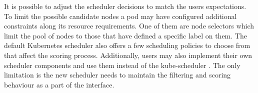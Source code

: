 It is possible to adjust the scheduler decisions to match the users expectations. 
To limit the possible candidate nodes a pod may have configured additional constraints along its resource requirements.
One of them are node selectors which limit the pool of nodes to those that have defined a specific label on them.
The default Kubernetes scheduler also offers a few scheduling policies to choose from that affect the scoring process.
Additionally, users may also implement their own scheduler components and use them instead of the kube-scheduler \cite{b:Kubernetes-scheduler}.
The only limitation is the new scheduler needs to maintain the filtering and scoring behaviour as a part of the interface.

